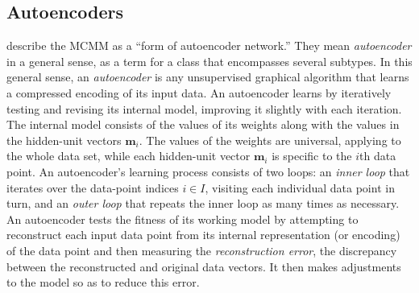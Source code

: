 \subsection{Autoencoders}
\label{sec:autoencoders}
\citet[][p. 2]{dayan-and-zemel:95} describe the MCMM as a ``form of autoencoder network.'' 
They mean \emph{autoencoder} in a general sense, as a term for a class that encompasses several subtypes.  
In this general sense, an \emph{autoencoder} is any unsupervised graphical algorithm that
learns a compressed encoding of its input data. 
An autoencoder learns by iteratively testing and revising its internal model, improving it slightly with each iteration. 
The internal model consists of the values of its weights along with 
the values in the hidden-unit vectors $\textbf{m}_i$. The values 
of the weights are universal, applying to the whole data set, while 
each hidden-unit vector $\textbf{m}_i$ is specific to the $i$th data point. 
An autoencoder's learning process consists of two
loops: an \emph{inner loop} that iterates over the data-point indices $i \in I$, 
visiting each individual data point in turn, and an \emph{outer loop} that repeats 
the inner loop as many times as necessary.
An autoencoder tests the fitness of its working model by attempting to reconstruct each input data 
point from its internal representation (or encoding) of the data point 
and then measuring the \emph{reconstruction error}, the discrepancy between the reconstructed and original data vectors.  
It then makes adjustments to the model so as to reduce this error. %

